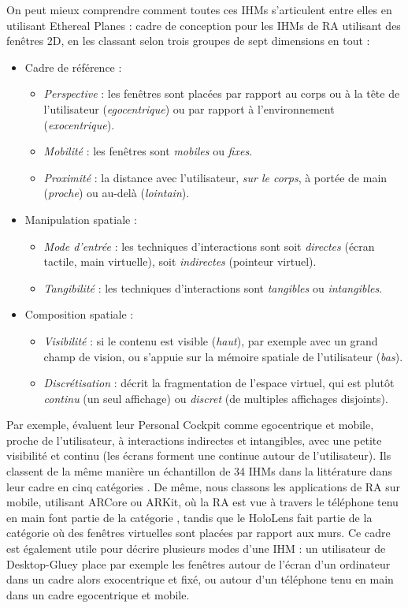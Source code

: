 On peut mieux comprendre comment toutes ces IHMs s'articulent entre elles en utilisant Ethereal Planes \citep{Ens2014a} : cadre de conception pour les IHMs de RA utilisant des fenêtres 2D, en les classant selon trois groupes de sept dimensions en tout :
\begin{itemize}
  \item Cadre de référence :
  \begin{itemize}
    \item \emph{Perspective} : les fenêtres sont placées par rapport au corps ou à la tête de l'utilisateur (\emph{egocentrique}) ou par rapport à l'environnement (\emph{exocentrique}).
    \item \emph{Mobilité} : les fenêtres sont \emph{mobiles} ou \emph{fixes}.
    \item \emph{Proximité} : la distance avec l'utilisateur, \emph{sur le corps}, à portée de main (\emph{proche}) ou au-delà (\emph{lointain}).
  \end{itemize}
  \item Manipulation spatiale :
  \begin{itemize}
    \item \emph{Mode d'entrée} : les techniques d'interactions sont soit \emph{directes} (écran tactile, main virtuelle), soit \emph{indirectes} (pointeur virtuel).
    \item \emph{Tangibilité} : les techniques d'interactions sont \emph{tangibles} ou \emph{intangibles}.
  \end{itemize}
  \item Composition spatiale :
  \begin{itemize}
    \item \emph{Visibilité} : si le contenu est visible (\emph{haut}), par exemple avec un grand champ de vision, ou s'appuie sur la mémoire spatiale de l'utilisateur (\emph{bas}).
    \item \emph{Discrétisation} : décrit la fragmentation de l'espace virtuel, qui est plutôt \emph{continu} (un seul affichage) ou \emph{discret} (de multiples affichages disjoints).
  \end{itemize}
\end{itemize}
\bigskip

Par exemple, \cite{Ens2014a} évaluent leur Personal Cockpit comme egocentrique et mobile, proche de l'utilisateur, à interactions indirectes et intangibles, avec une petite visibilité et continu (les écrans forment une  continue autour de l'utilisateur). Ils classent de la même manière un échantillon de 34 IHMs dans la littérature dans leur cadre en cinq catégories . De même, nous classons les applications de RA sur mobile, utilisant ARCore ou ARKit, où la RA est vue à travers le téléphone tenu en main font partie de la catégorie , tandis que le HoloLens fait partie de la catégorie  où des fenêtres virtuelles sont placées par rapport aux murs. Ce cadre est également utile pour décrire plusieurs modes d'une IHM : un utilisateur de Desktop-Gluey place par exemple les fenêtres autour de l'écran d'un ordinateur dans un cadre alors exocentrique et fixé, ou autour d'un téléphone tenu en main dans un cadre egocentrique et mobile.

